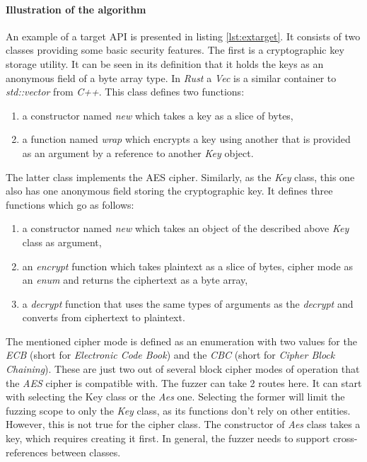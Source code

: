 \paragraph{Illustration of the algorithm}
An example of a target API is presented in listing \ref{lst:extarget}. It consists of two classes providing some basic security features. The first is a cryptographic key storage utility. It can be seen in its definition that it holds the keys as an anonymous field of a byte array type. In \textit{Rust} a \textit{Vec} is a similar container to \textit{std::vector} from \textit{C++}. This class defines two functions:
\begin{enumerate}
    \item a constructor named \textit{new} which takes a key as a slice of bytes,
    \item a function named \textit{wrap} which encrypts a key using another that is provided as an argument by a reference to another \textit{Key} object.
\end{enumerate}
The latter class implements the AES cipher. Similarly, as the \textit{Key} class, this one also has one anonymous field storing the cryptographic key. It defines three functions which go as follows:
\begin{enumerate}
    \item a constructor named \textit{new} which takes an object of the described above \textit{Key} class as argument,
    \item an \textit{encrypt} function which takes plaintext as a slice of bytes, cipher mode as an \textit{enum} and returns the ciphertext as a byte array,
    \item a \textit{decrypt} function that uses the same types of arguments as the \textit{decrypt} and converts from ciphertext to plaintext.
\end{enumerate}
The mentioned cipher mode is defined as an enumeration with two values for the \textit{ECB} (short for \textit{Electronic Code Book}) and the \textit{CBC} (short for \textit{Cipher Block Chaining}). These are just two out of several block cipher modes of operation that the \textit{AES} cipher is compatible with. The fuzzer can take 2 routes here. It can start with selecting the Key class or the \textit{Aes} one. Selecting the former will limit the fuzzing scope to only the \textit{Key} class, as its functions don't rely on other entities. However, this is not true for the cipher class. The constructor of \textit{Aes} class takes a key, which requires creating it first. In general, the fuzzer needs to support cross-references between classes.

